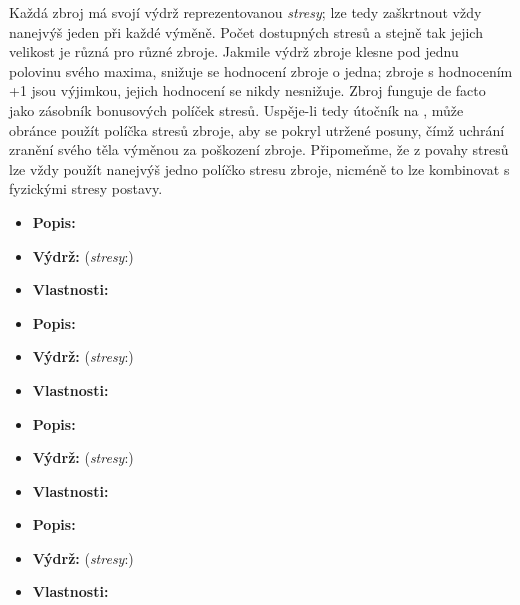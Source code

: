 \documentclass[../main.tex]{subfiles}
\begin{document}
\begin{Real}[Zbroje]
	Každá zbroj má svojí výdrž reprezentovanou \emph{stresy}; lze tedy zaškrtnout vždy nanejvýš jeden při každé výměně. Počet dostupných stresů a stejně tak jejich velikost je různá pro různé zbroje. Jakmile výdrž zbroje klesne pod jednu polovinu svého maxima, snižuje se hodnocení zbroje o jedna; zbroje s hodnocením +1 jsou výjimkou, jejich hodnocení se nikdy nesnižuje. 
	Zbroj funguje de facto jako zásobník bonusových políček stresů. Uspěje-li tedy útočník na , může obránce použít políčka stresů zbroje, aby se pokryl utržené posuny, čímž uchrání zranění svého těla výměnou za poškození zbroje. \sidenotemark Připomeňme, že z povahy stresů lze vždy použít nanejvýš jedno políčko stresu zbroje, nicméně to lze kombinovat s fyzickými stresy postavy.
\end{Real}
\begin{predmet}
\begin{itemize}
	\item \textbf{Popis:} 
	\item \textbf{Výdrž:} (\emph{stresy}:) 
	\item \textbf{Vlastnosti:} 
\end{itemize}
\end{predmet}


\begin{predmet}
\begin{itemize}
	\item \textbf{Popis:} 
	\item \textbf{Výdrž:} (\emph{stresy}:) 
	\item \textbf{Vlastnosti:} 
\end{itemize}
\end{predmet}

\begin{predmet}
\begin{itemize}
	\item \textbf{Popis:} 
	\item \textbf{Výdrž:} (\emph{stresy}:) 
	\item \textbf{Vlastnosti:} 
\end{itemize}
\end{predmet}


\begin{predmet}
\begin{itemize}
	\item \textbf{Popis:} 
	\item \textbf{Výdrž:} (\emph{stresy}:) 
	\item \textbf{Vlastnosti:} 
\end{itemize}
\end{predmet}
\end{document}
